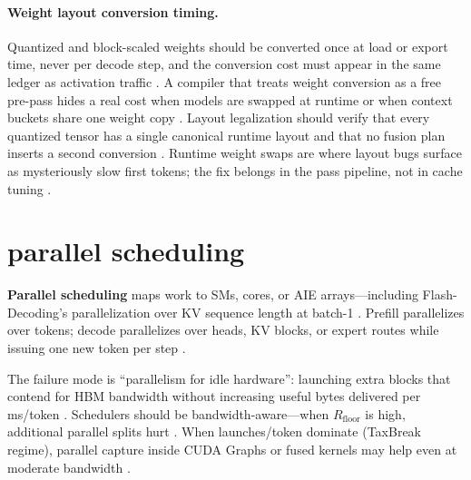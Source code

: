 \paragraph{Weight layout conversion timing.}
Quantized and block-scaled weights should be converted once at load or export time, never per decode step, and the conversion cost must appear in the same ledger as activation traffic \citep{liu2024deepseekv3,patel2025llminference,memoryfloor2026}. A compiler that treats weight conversion as a free pre-pass hides a real cost when models are swapped at runtime or when context buckets share one weight copy \citep{chen2020compilerbasedhardw,yirage2026}. Layout legalization should verify that every quantized tensor has a single canonical runtime layout and that no fusion plan inserts a second conversion \citep{patel2025llminference,chen2020compilerbasedhardw}. Runtime weight swaps are where layout bugs surface as mysteriously slow first tokens; the fix belongs in the pass pipeline, not in cache tuning \citep{taxbreak2026,memoryfloor2026}.

\section{parallel scheduling}
\label{sec:ch13_parallel_scheduling}

\textbf{Parallel scheduling} maps work to SMs, cores, or AIE arrays---including Flash-Decoding's parallelization over KV sequence length at batch-1 \citep{dao2023flashdecoding,patel2025llminference,taxbreak2026}. Prefill parallelizes over tokens; decode parallelizes over heads, KV blocks, or expert routes while issuing one new token per step \citep{kwon2023vllm,dlbook,dao2022flashattention,memoryfloor2026,yirage2026,chen2020compilerbasedhardw,semianalysis2024tma,amd2024xdna,liu2024deepseekv3,dao2023flashdecoding,nvidia2022hopper,nvidia2024cudagraphs,amd2024aie,taxbreak2026,patel2025llminference}.

The failure mode is ``parallelism for idle hardware'': launching extra blocks that contend for HBM bandwidth without increasing useful bytes delivered per ms/token \citep{memoryfloor2026,semianalysis2024tma,patel2025llminference,taxbreak2026}. Schedulers should be bandwidth-aware---when $R_{\mathrm{floor}}$ is high, additional parallel splits hurt \citep{memoryfloor2026,taxbreak2026,yirage2026,chen2020compilerbasedhardw,amd2024xdna,amd2024aie,dlbook,kwon2023vllm,liu2024deepseekv3,dao2022flashattention,dao2023flashdecoding,nvidia2022hopper,nvidia2024cudagraphs,semianalysis2024tma,patel2025llminference}. When launches/token dominate (TaxBreak regime), parallel capture inside CUDA Graphs or fused kernels may help even at moderate bandwidth \citep{taxbreak2026,nvidia2024cudagraphs,memoryfloor2026,yirage2026,chen2020compilerbasedhardw,patel2025llminference,amd2024xdna,semianalysis2024tma,dlbook,kwon2023vllm,liu2024deepseekv3,dao2022flashattention,dao2023flashdecoding,nvidia2022hopper,amd2024aie}.

